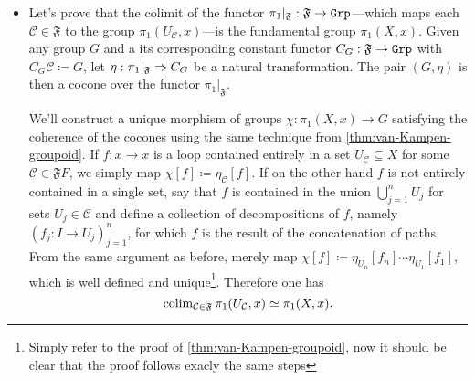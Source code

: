 \begin{itemize}\setlength\itemsep{0em}
\item Let's prove that the colimit of the functor
  \(\pi_1|_{\mathfrak{F}}: \mathfrak{F} \to {\texttt{Grp}}\)---which maps each
  \(\mathcal{C} \in \mathfrak{F}\) to the group
  \(\pi_1(U_{\mathcal{C}}, x)\)---is the fundamental group \(\pi_1(X,
  x)\). Given any group \(G\) and a its corresponding constant functor
  \(C_G: \mathfrak{F} \to {\texttt{Grp}}\) with \(C_G \mathcal{C} \coloneq G\), let
  \(\eta: \pi_1|_{\mathfrak{F}} \Rightarrow C_G\) be a natural transformation. The pair
  \((G, \eta)\) is then a cocone over the functor \(\pi_1|_{\mathfrak F}\).

  We'll construct a unique morphism of groups \(\chi: \pi_1(X, x) \to G\)
  satisfying the coherence of the cocones using the same technique from
  \cref{thm:van-Kampen-groupoid}. If \(f: x \to x\) is a loop contained entirely
  in a set \(U_{\mathcal{C}} \subseteq X\) for some
  \(\mathcal{C} \in \mathfrak{F} F\), we simply map
  \(\chi [f] \coloneq \eta_{\mathcal{C}} [f]\). If on the other hand \(f\) is
  not entirely contained in a single set, say that \(f\) is contained in the
  union \(\bigcup_{j=1}^n U_j\) for sets \(U_j \in \mathcal{C}\) and define a
  collection of decompositions of \(f\), namely \((f_j: I \to U_j)_{j=1}^n\),
  for which \(f\) is the result of the concatenation of paths. From the same
  argument as before, merely map
  \(\chi [f] \coloneq \eta_{U_n} [f_n] \cdots \eta_{U_1} [f_1]\), which is well
  defined and unique\footnote{Simply refer to the proof of
    \cref{thm:van-Kampen-groupoid}, now it should be clear that the proof
    follows exacly the same steps}. Therefore one has
  \begin{equation}\label{eq:van-kampen-grp-2}
  \operatorname{colim}_{\mathcal{C} \in \mathfrak{F}} \pi_1(U_{\mathcal{C}}, x) \simeq \pi_1(X, x).
  \end{equation}


\end{itemize}

